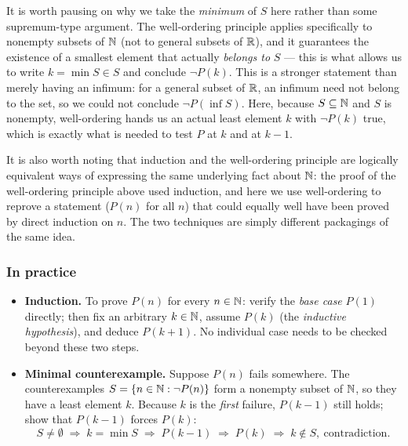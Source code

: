 \begin{remark}
    It is worth pausing on why we take the \emph{minimum} of $S$ here rather than some supremum-type argument. The well-ordering principle applies specifically to nonempty subsets of $\mathbb{N}$ (not to general subsets of $\mathbb{R}$), and it guarantees the existence of a smallest element that actually \emph{belongs to} $S$ — this is what allows us to write $k=\min S\in S$ and conclude $\neg P(k)$. This is a stronger statement than merely having an infimum: for a general subset of $\mathbb{R}$, an infimum need not belong to the set, so we could not conclude $\neg P(\inf S)$. Here, because $S\subseteq\mathbb{N}$ and $S$ is nonempty, well-ordering hands us an actual least element $k$ with $\neg P(k)$ true, which is exactly what is needed to test $P$ at $k$ and at $k-1$.

    It is also worth noting that induction and the well-ordering principle are logically equivalent ways of expressing the same underlying fact about $\mathbb{N}$: the proof of the well-ordering principle above used induction, and here we use well-ordering to reprove a statement ($P(n)$ for all $n$) that could equally well have been proved by direct induction on $n$. The two techniques are simply different packagings of the same idea.
\end{remark}

\subsubsection*{In practice}
\begin{itemize}
    \item \textbf{Induction.} To prove $P(n)$ for every $n\in\mathbb{N}$: verify the \emph{base case} $P(1)$ directly; then fix an arbitrary $k\in\mathbb{N}$, assume $P(k)$ (the \emph{inductive hypothesis}), and deduce $P(k+1)$. No individual case needs to be checked beyond these two steps.
    \item \textbf{Minimal counterexample.} Suppose $P(n)$ fails somewhere. The counterexamples $S=\left\{n\in\mathbb{N}:\neg P(n)\right\}$ form a nonempty subset of $\mathbb{N}$, so they have a least element $k$. Because $k$ is the \emph{first} failure, $P(k-1)$ still holds; show that $P(k-1)$ forces $P(k)$:
    \[
        S\neq\emptyset \;\Rightarrow\; k=\min S \;\Rightarrow\; P(k-1) \;\Rightarrow\; P(k) \;\Rightarrow\; k\notin S,\ \text{contradiction.}
    \]
\end{itemize}
